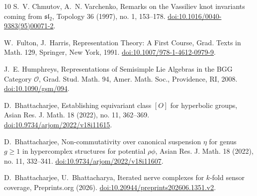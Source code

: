 \documentclass[11pt,a4paper,reqno]{amsart}
\theoremstyle{definition}
\begin{document}
\begin{thebibliography}{10}
S.~V. Chmutov, A.~N. Varchenko, Remarks on the Vassiliev knot invariants coming from $\mathfrak{sl}_2$, Topology 36 (1997), no. 1, 153--178. \href{https://doi.org/10.1016/0040-9383(95)00071-2}{doi:10.1016/0040-9383(95)00071-2}.

W.~Fulton, J.~Harris, Representation Theory: A First Course, Grad. Texts in Math. 129, Springer, New York, 1991. \href{https://doi.org/10.1007/978-1-4612-0979-9}{doi:10.1007/978-1-4612-0979-9}.

J.~E. Humphreys, Representations of Semisimple Lie Algebras in the BGG Category $\mathcal{O}$, Grad. Stud. Math. 94, Amer. Math. Soc., Providence, RI, 2008. \href{https://doi.org/10.1090/gsm/094}{doi:10.1090/gsm/094}.

D.~Bhattacharjee, Establishing equivariant class $[O]$ for hyperbolic groups, Asian Res. J. Math. 18 (2022), no. 11, 362--369. \href{https://doi.org/10.9734/arjom/2022/v18i11615}{doi:10.9734/arjom/2022/v18i11615}.

D.~Bhattacharjee, Non-commutativity over canonical suspension $\eta$ for genus $g\ge1$ in hypercomplex structures for potential $\rho\phi$, Asian Res. J. Math. 18 (2022), no. 11, 332--341. \href{https://doi.org/10.9734/arjom/2022/v18i11607}{doi:10.9734/arjom/2022/v18i11607}.

D.~Bhattacharjee, U.~Bhattacharya, Iterated nerve complexes for $k$-fold sensor coverage, Preprints.org (2026). \href{https://doi.org/10.20944/preprints202606.1351.v2}{doi:10.20944/preprints202606.1351.v2}.

\end{thebibliography}
\end{document}
